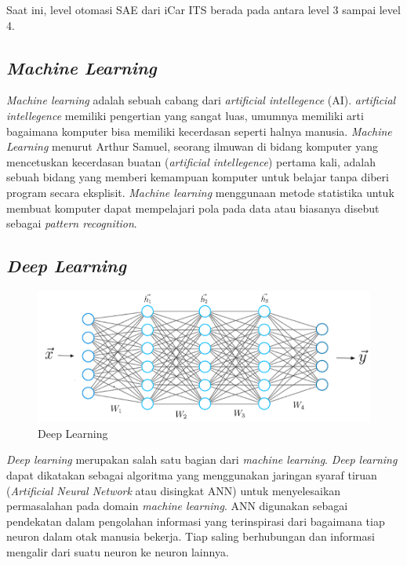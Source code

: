 Saat ini, level otomasi SAE dari iCar ITS berada pada antara level 3 sampai level 4. \cite{cit:icar_its_news}

\subsection{\textit{Machine Learning}}

\textit{Machine learning} adalah sebuah cabang dari \textit{artificial intellegence} (AI). \textit{artificial intellegence} memiliki pengertian yang sangat luas, umumnya memiliki arti bagaimana komputer bisa memiliki kecerdasan seperti halnya manusia. \textit{Machine Learning }menurut Arthur Samuel, seorang ilmuwan di bidang komputer yang mencetuskan kecerdasan buatan (\textit{artificial intellegence}) pertama kali, adalah sebuah bidang yang memberi kemampuan komputer untuk belajar tanpa diberi program secara eksplisit. \textit{Machine learning} menggunaan metode statistika untuk membuat komputer dapat mempelajari pola pada data atau biasanya disebut sebagai \textit{pattern recognition}. \cite{cit:ml_patternrecog}

\subsection{\textit{Deep Learning}}
\begin{figure}[H] 
	\centering
	\includegraphics[width=.4\linewidth]{images/deep_learning}
	\caption{Deep Learning}
	\label{fig:deep_learning}
\end{figure}
\textit{Deep learning} merupakan salah satu bagian dari \textit{machine learning}. \textit{Deep learning} dapat dikatakan sebagai algoritma yang menggunakan jaringan syaraf tiruan (\textit{Artificial Neural Network} atau disingkat ANN) untuk menyelesaikan permasalahan pada domain \textit{machine learning}. ANN digunakan sebagai pendekatan dalam pengolahan informasi yang terinspirasi dari bagaimana tiap neuron dalam otak manusia bekerja. Tiap saling berhubungan dan informasi mengalir dari suatu neuron ke neuron lainnya. \cite{cit:deep_learning}

